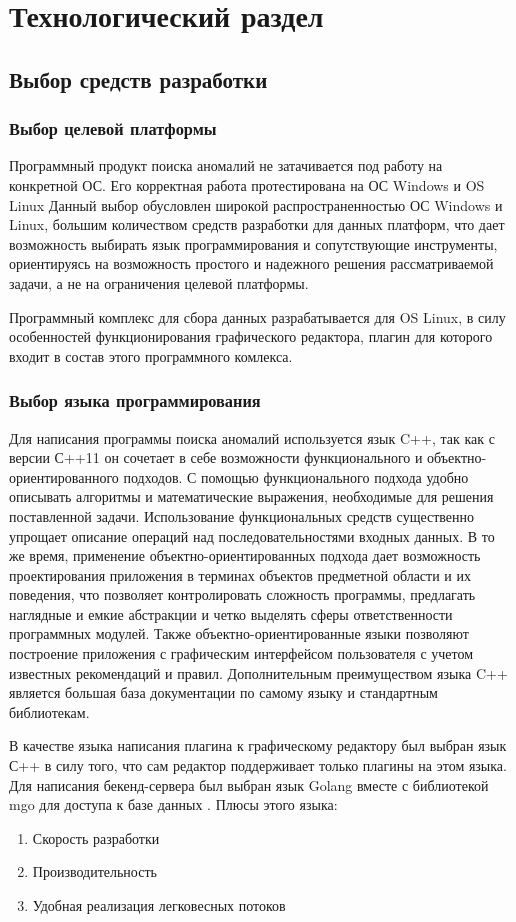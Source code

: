 \chapter{Технологический раздел}
\section{Выбор средств разработки}
\subsection{Выбор целевой платформы}
Программный продукт поиска аномалий не затачивается под работу на конкретной ОС. Его корректная работа протестирована на ОС Windows и OS Linux Данный выбор обусловлен широкой распространенностью ОС Windows и Linux, большим количеством средств разработки для данных платформ, что дает возможность выбирать
язык программирования и сопутствующие инструменты, ориентируясь на возможность простого и надежного решения рассматриваемой
задачи, а не на ограничения целевой платформы.

Программный комплекс для сбора данных разрабатывается для OS Linux, в силу особенностей функционирования графического редактора, плагин для которого входит в состав этого программного комлекса.
\subsection{Выбор языка программирования}
Для написания программы поиска аномалий используется язык C++, так
как с версии С++11 он сочетает в себе возможности функционального и
объектно-ориентированного подходов.
С помощью функционального подхода удобно описывать алгоритмы
и математические выражения, необходимые для решения поставленной
задачи. Использование функциональных средств существенно упрощает
описание операций над последовательностями входных данных.
В то же время, применение объектно-ориентированных подхода дает
возможность проектирования приложения в терминах объектов предметной
области и их поведения, что позволяет контролировать сложность
программы, предлагать наглядные и емкие абстракции и четко выделять
сферы ответственности программных модулей.
Также объектно-ориентированные языки позволяют построение приложения с графическим интерфейсом пользователя с учетом известных рекомендаций и правил.
Дополнительным преимуществом языка C++ является большая база
документации по самому языку и стандартным библиотекам.


В качестве языка написания плагина к графическому редактору был выбран язык С++ в силу того, что сам редактор поддерживает только плагины на этом языка. 
Для написания бекенд-сервера был выбран язык Golang вместе с библиотекой  mgo для доступа к базе данных . Плюсы этого языка:
\begin{enumerate}
	
	\item Скорость разработки	 	
	
	\item Производительность
	
	\item Удобная реализация легковесных потоков 
\end{enumerate}

